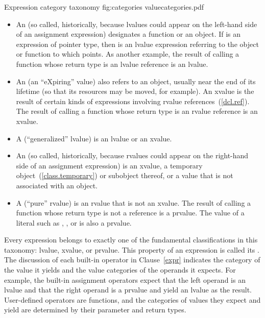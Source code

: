 \begin{importgraphic}
{Expression category taxonomy}
{fig:categories}
{valuecategories.pdf}
\end{importgraphic}

\begin{itemize}
\item An  (so called, historically, because lvalues could appear
on the left-hand side of an assignment expression) designates a function or an object.
\enterexample If  is an expression of pointer type, then  is
an lvalue expression referring to the object or function to which  points.
As another example, the result of calling a function whose return type is an
lvalue reference is an lvalue. \exitexample

\item An  (an ``eXpiring'' value) also refers to an object, usually near
the end of its lifetime (so that its resources may be moved, for example). An xvalue
is the result of certain kinds of expressions involving rvalue references~(\ref{dcl.ref}).
\enterexample The result of calling a function whose return type is an rvalue reference
is an xvalue. \exitexample

\item A  (``generalized'' lvalue) is an lvalue or an xvalue.

\item An  (so called, historically, because rvalues could appear
on the right-hand side of an assignment expression) is an xvalue, a temporary
object~(\ref{class.temporary}) or subobject thereof, or a value that is not
associated with an object.

\item A  (``pure'' rvalue) is an rvalue that is not an xvalue.
\enterexample The result of calling a function whose return type is not a reference
is a prvalue. The value of a literal such as , , or 
is also a prvalue. \exitexample
\end{itemize}

Every expression belongs to exactly one of the fundamental classifications in this
taxonomy: lvalue, xvalue, or prvalue. This property of an expression is called
its . \enternote The discussion of each built-in operator in
Clause~\ref{expr} indicates the category of the value it yields and the value categories
of the operands it expects. For example, the built-in assignment operators expect that
the left operand is an lvalue and that the right operand is a prvalue and yield an
lvalue as the result. User-defined operators are functions, and the categories of
values they expect and yield are determined by their parameter and return types. \exitnote

